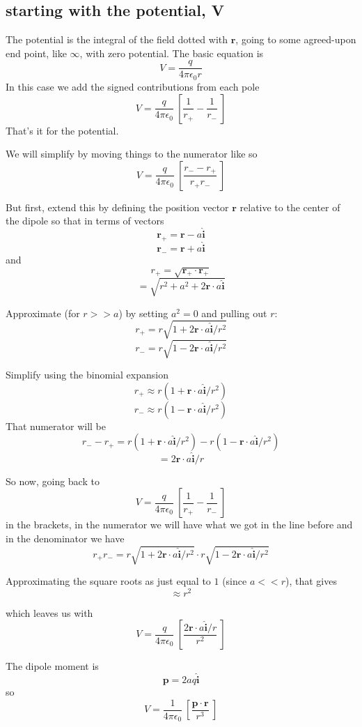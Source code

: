 \documentclass[11pt, oneside]{article}
\begin{document}
\subsection*{starting with the potential, V}

The potential is the integral of the field dotted with $\mathbf{r}$, going to some agreed-upon end point, like $\infty$, with zero potential.  The basic equation is
\[ V = \frac{q}{4 \pi \epsilon_0 r} \]
In this case we add the signed contributions from each pole
\[ V = \frac{q}{4 \pi \epsilon_0} \ [ \frac{1}{r_+} -  \frac{1}{r_-}  \ ] \]
That's it for the potential.

We will simplify by moving things to the numerator like so
\[ V = \frac{q}{4 \pi \epsilon_0} \ [ \frac{r_- - r_+}{r_+ r_-}  \ ] \]

But first, extend this by defining the position vector $\mathbf{r}$ relative to the center of the dipole so that in terms of vectors
\[ \mathbf{r}_+ = \mathbf{r} - a \mathbf{\hat{i}} \]
\[ \mathbf{r}_- = \mathbf{r} + a \mathbf{\hat{i}} \]
and
\[ r_+ = \sqrt{\mathbf{r}_+ \cdot \mathbf{r}_+} \]
\[ = \sqrt{r^2 + a^2 + 2 \mathbf{r} \cdot a \mathbf{\hat{i}}} \]

Approximate (for $r >> a$) by setting $a^2 = 0$ and pulling out $r$:
\[ r_+ = r \sqrt{1 + 2 \mathbf{r} \cdot a \mathbf{\hat{i}}/r^2}  \]
\[ r_- = r \sqrt{1 - 2 \mathbf{r} \cdot a \mathbf{\hat{i}}/r^2}  \]

Simplify using the binomial expansion
\[ r_+  \approx r(1 + \mathbf{r} \cdot a \mathbf{\hat{i}}/r^2) \]
\[ r_-  \approx r(1 - \mathbf{r} \cdot a \mathbf{\hat{i}}/r^2) \]
That numerator will be
\[ r_- - r_+ = r(1 + \mathbf{r} \cdot a \mathbf{\hat{i}}/r^2) - r(1 - \mathbf{r} \cdot a \mathbf{\hat{i}}/r^2) \]
\[ = 2 \mathbf{r} \cdot a \mathbf{\hat{i}}/r \]

So now, going back to
\[ V = \frac{q}{4 \pi \epsilon_0} \ [ \frac{1}{r_+} -  \frac{1}{r_-}  \ ] \]
in the brackets, in the numerator we will have what we got in the line before and in the denominator we have
\[ r_+ r_- = r \sqrt{1 + 2 \mathbf{r} \cdot a \mathbf{\hat{i}}/r^2} \cdot r \sqrt{1 - 2 \mathbf{r} \cdot a \mathbf{\hat{i}}/r^2} \]

Approximating the square roots as just equal to $1$ (since $a << r$), that gives
\[ \approx r^2 \]

which leaves us with
\[ V = \frac{q}{4 \pi \epsilon_0} \ [ \frac{2 \mathbf{r} \cdot a \mathbf{\hat{i}}/r}{r^2}  \ ] \]

The dipole moment is
\[ \mathbf{p} = 2 a q \mathbf{\hat{i}} \]
so
\[ V = \frac{1}{4 \pi \epsilon_0} \ [ \frac{\mathbf{p} \cdot \mathbf{r}}{r^3}  \ ] \]
\end{document}
